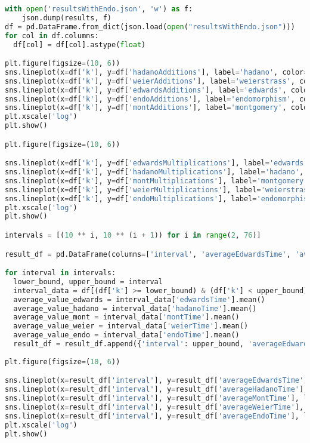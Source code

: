 \begin{lstlisting}[language=python]
with open('resultsWithEndo.json', 'w') as f:
    json.dump(results, f)
df = pd.DataFrame.from_dict(json.load(open("resultsWithEndo.json")))
for col in df.columns:
  df[col] = df[col].astype(float)

plt.figure(figsize=(10, 6))
sns.lineplot(x=df['k'], y=df['hadanoAdditions'], label='hadano', color='brown')
sns.lineplot(x=df['k'], y=df['weierAdditions'], label='weierstrass', color='orange')
sns.lineplot(x=df['k'], y=df['edwardsAdditions'], label='edwards', color='r')
sns.lineplot(x=df['k'], y=df['endoAdditions'], label='endomorphism', color='g')
sns.lineplot(x=df['k'], y=df['montAdditions'], label='montgomery', color='y')
plt.xscale('log')
plt.show()

plt.figure(figsize=(10, 6))

sns.lineplot(x=df['k'], y=df['edwardsMultiplications'], label='edwards', color='r')
sns.lineplot(x=df['k'], y=df['hadanoMultiplications'], label='hadano', color='brown')
sns.lineplot(x=df['k'], y=df['montMultiplications'], label='montgomery', color='y')
sns.lineplot(x=df['k'], y=df['weierMultiplications'], label='weierstrass', color='orange')
sns.lineplot(x=df['k'], y=df['endoMultiplications'], label='endomorphism', color='g')
plt.xscale('log')
plt.show()

intervals = [(10 ** i, 10 ** (i + 1)) for i in range(2, 76)]

result_df = pd.DataFrame(columns=['interval', 'averageEdwardsTime', 'averageHadanoTime', 'averageMontTime', 'averageWeierTime', 'averageEndoTime'])

for interval in intervals:
  lower_bound, upper_bound = interval
  interval_data = df[(df['k'] >= lower_bound) & (df['k'] < upper_bound)]
  average_value_edwards = interval_data['edwardsTime'].mean()
  average_value_hadano = interval_data['hadanoTime'].mean()
  average_value_mont = interval_data['montTime'].mean()
  average_value_weier = interval_data['weierTime'].mean()
  average_value_endo = interval_data['endoTime'].mean()
  result_df = result_df.append({'interval': upper_bound, 'averageEdwardsTime': average_value_edwards, 'averageHadanoTime': average_value_hadano, 'averageMontTime': average_value_mont, 'averageWeierTime': average_value_weier, 'averageEndoTime': average_value_endo}, ignore_index=True)
  
plt.figure(figsize=(10, 6))

sns.lineplot(x=result_df['interval'], y=result_df['averageEdwardsTime'], label='edwards', color='r')
sns.lineplot(x=result_df['interval'], y=result_df['averageHadanoTime'], label='hadano', color='brown')
sns.lineplot(x=result_df['interval'], y=result_df['averageMontTime'], label='montgomery', color='y')
sns.lineplot(x=result_df['interval'], y=result_df['averageWeierTime'], label='weierstrass', color='orange')
sns.lineplot(x=result_df['interval'], y=result_df['averageEndoTime'], label='endomorphism', color='g')
plt.xscale('log')
plt.show()
\end{lstlisting}